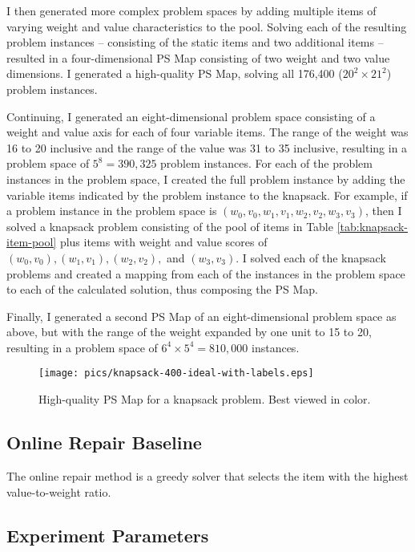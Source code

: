 I then generated more complex problem spaces  by adding multiple items of varying weight and value characteristics to the pool.  Solving each of the resulting problem instances -- consisting of the static items and two additional items -- resulted in a four-dimensional PS Map consisting of two weight and two value dimensions.  I generated a high-quality PS Map, solving all 176,400 ($20^2 \times 21^2$) problem instances.  

Continuing, I generated an eight-dimensional problem space consisting of a weight and value axis for each of four variable items.  The range of the weight was 16 to 20 inclusive and the range of the value was 31 to 35 inclusive, resulting in a problem space of $5^8 = 390,325$ problem instances.  For each of the problem instances in the problem space, I created the full problem instance by adding the variable items indicated by the problem instance to the knapsack.  For example, if a problem instance in the problem space is $(w_0,v_0,w_1,v_1,w_2,v_2,w_3,v_3)$, then I solved a knapsack problem consisting of the pool of items in Table \ref{tab:knapsack-item-pool} plus items with weight and value scores of $(w_0,v_0),(w_1,v_1),(w_2,v_2),$ and $(w_3,v_3)$.  I solved each of the knapsack problems and created a mapping from each of the instances in the problem space to each of the calculated solution, thus composing the PS Map.

Finally, I generated a second PS Map of an eight-dimensional problem space as above, but with the range of the weight expanded by one unit to 15 to 20, resulting in a problem space of $6^4 \times 5^4 = 810,000$ instances.

\begin{figure}
\begin{center}
\texttt{[image: pics/knapsack-400-ideal-with-labels.eps]}
\caption{High-quality PS Map for a knapsack problem.  Best viewed in color.}
\label{fig:knapsack-ideal}
\end{center}
\end{figure}

\subsection{Online Repair Baseline}  The online repair method is a greedy solver that selects the item with the highest value-to-weight ratio.


\subsection{Experiment Parameters}

